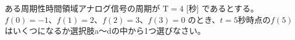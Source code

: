 ある周期性時間領域アナログ信号の周期が $\textrm{T} = 4$ [秒] であるとする。
$f(0) = -1$、$f(1) = 2$、$f(2) = 3$、$f(3) = 0$ のとき、$t=5$秒時点の$f(5)$ はいくつになるか選択肢a〜dの中から1つ選びなさい。
